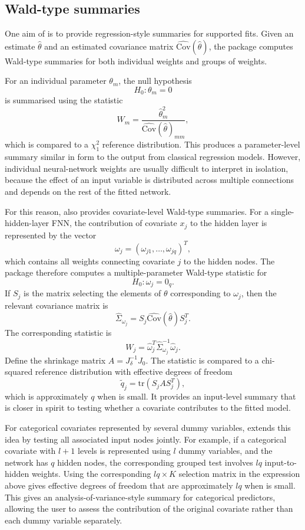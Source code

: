 \subsection{Wald-type summaries}\label{wald-type-summaries}

One aim of  is to provide regression-style summaries for supported  fits.
Given an estimate \(\hat{\theta}\) and an estimated covariance matrix \(\widehat{\mathrm{Cov}}(\hat{\theta})\), the package computes Wald-type summaries for both individual weights and groups of weights.

For an individual parameter \(\theta_m\), the null hypothesis \[
    H_0: \theta_m = 0
\] is summarised using the statistic \[
    W_m = \frac{\hat{\theta}_m^2}{\widehat{\mathrm{Cov}}(\hat{\theta})_{mm}},
\] which is compared to a \(\chi^2_1\) reference distribution.
This produces a parameter-level summary similar in form to the output from classical regression models.
However, individual neural-network weights are usually difficult to interpret in isolation, because the effect of an input variable is distributed across multiple connections and depends on the rest of the fitted network.

For this reason,  also provides covariate-level Wald-type summaries.
For a single-hidden-layer FNN, the contribution of covariate \(x_j\) to the hidden layer is represented by the vector \[
    \omega_j = (\omega_{j1}, \dots, \omega_{jq})^T,
\] which contains all weights connecting covariate \(j\) to the hidden nodes.
The package therefore computes a multiple-parameter Wald-type statistic for \[
    H_0: \omega_j = 0_q.
\] If \(S_j\) is the matrix selecting the elements of \(\theta\) corresponding to \(\omega_j\), then the relevant covariance matrix is \[
    \widehat{\Sigma}_{\omega_j}
    =
    S_j \widehat{\mathrm{Cov}}(\hat{\theta}) S_j^T.
\] The corresponding statistic is \[
    W_j =
    \hat{\omega}_j^T
    \widehat{\Sigma}_{\omega_j}^{-1}
    \hat{\omega}_j.
\] Define the shrinkage matrix \(A=J_\delta^{-1}J_0\).
The statistic is compared to a chi-squared reference distribution with effective degrees of freedom
\[
  \tilde q_j
  =
  \mathrm{tr}(S_j A S_j^T),
\]
which is approximately \(q\) when  is small.
It provides an input-level summary that is closer in spirit to testing whether a covariate contributes to the fitted model.

For categorical covariates represented by several dummy variables,  extends this idea by testing all associated input nodes jointly.
For example, if a categorical covariate with \(l+1\) levels is represented using \(l\) dummy variables, and the network has \(q\) hidden nodes, the corresponding grouped test involves \(lq\) input-to-hidden weights.
Using the corresponding \(lq\times K\) selection matrix in the expression above gives effective degrees of freedom that are approximately \(lq\) when  is small.
This gives an analysis-of-variance-style summary for categorical predictors, allowing the user to assess the contribution of the original covariate rather than each dummy variable separately.

